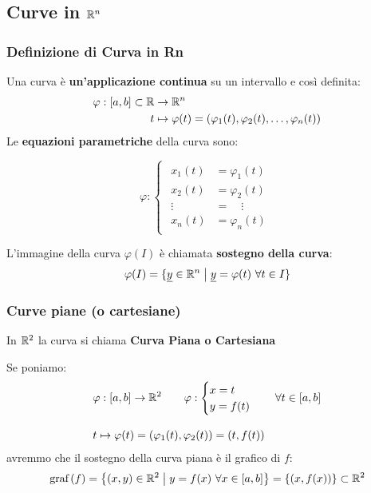 \subsection{Curve in \texorpdfstring{\(\mathbb{R}^{n} \)}{Rn}}

\subsubsection{Definizione di Curva in Rn}

Una curva è \textbf{un'applicazione continua} su un intervallo e così definita:
\begin{align*}
    \varphi: [a,b] \subset \mathbb{R} & \rightarrow \mathbb{R}^{n}                                                        \\
    t                         & \mapsto \varphi(t) = (\varphi_1(t),\varphi_2(t), \ldots ,\varphi_n(t))
\end{align*}
Le \textbf{equazioni parametriche} della curva sono:

\begin{equation*}
    \varphi:
    \begin{cases}
        \begin{aligned}
            x_1(t)      & = \varphi_1(t) \\
            x_2(t)      & = \varphi_2(t) \\
            \vdots\quad & = \quad\vdots  \\
            x_n(t)      & = \varphi_n(t)
        \end{aligned}
    \end{cases}
\end{equation*}

L'immagine della curva \(\varphi(I)\) è chiamata \textbf{sostegno della curva}:
\[
    \varphi(I) = \{\underline{y} \in \mathbb{R}^{n} \;\big|\; \underline{y} = \varphi(t) ~\forall t \in I\}
\]

\subsubsection{Curve piane (o cartesiane)}

In \(\mathbb{R}^2\) la curva si chiama \textbf{Curva Piana o Cartesiana}

Se poniamo:
\begin{align*}
     & \varphi: [a,b]\rightarrow \mathbb{R}^{2} \qquad \varphi: \begin{cases}
                                                            x = t \\
                                                            y = f(t)
                                                        \end{cases} \quad \forall t \in [a,b] \\[3mm]
     & t \mapsto \varphi(t) = (\varphi_1(t), \varphi_2(t)) = (t,f(t))
\end{align*}
avremmo che il sostegno della curva piana è il grafico di \(f\):
\[
    \text{graf}\left(f\right) = \left\{(x,y) \in \mathbb{R}^2 \;\big|\; y=f(x) ~\forall x \in [a,b]\right\} = \left\{(x,f(x))\right\} \subset \mathbb{R}^2
\]

